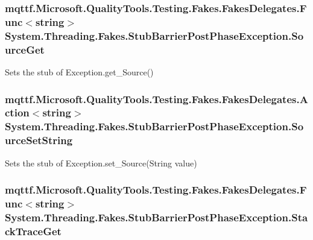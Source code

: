 \hypertarget{class_system_1_1_threading_1_1_fakes_1_1_stub_barrier_post_phase_exception_ab888341b897e42ecb92e83d6db81311c}{
\subsubsection[{Source\-Get}]{\setlength{\rightskip}{0pt plus 5cm}mqttf.\-Microsoft.\-Quality\-Tools.\-Testing.\-Fakes.\-Fakes\-Delegates.\-Func$<$string$>$ System.\-Threading.\-Fakes.\-Stub\-Barrier\-Post\-Phase\-Exception.\-Source\-Get}}\label{class_system_1_1_threading_1_1_fakes_1_1_stub_barrier_post_phase_exception_ab888341b897e42ecb92e83d6db81311c}


Sets the stub of Exception.\-get\-\_\-\-Source()

\hypertarget{class_system_1_1_threading_1_1_fakes_1_1_stub_barrier_post_phase_exception_a8b358045c129a79c3876d8cf061d99c7}{
\subsubsection[{Source\-Set\-String}]{\setlength{\rightskip}{0pt plus 5cm}mqttf.\-Microsoft.\-Quality\-Tools.\-Testing.\-Fakes.\-Fakes\-Delegates.\-Action$<$string$>$ System.\-Threading.\-Fakes.\-Stub\-Barrier\-Post\-Phase\-Exception.\-Source\-Set\-String}}\label{class_system_1_1_threading_1_1_fakes_1_1_stub_barrier_post_phase_exception_a8b358045c129a79c3876d8cf061d99c7}


Sets the stub of Exception.\-set\-\_\-\-Source(\-String value)

\hypertarget{class_system_1_1_threading_1_1_fakes_1_1_stub_barrier_post_phase_exception_a6252fd2bab42cddbb758aab7ccd63432}{
\subsubsection[{Stack\-Trace\-Get}]{\setlength{\rightskip}{0pt plus 5cm}mqttf.\-Microsoft.\-Quality\-Tools.\-Testing.\-Fakes.\-Fakes\-Delegates.\-Func$<$string$>$ System.\-Threading.\-Fakes.\-Stub\-Barrier\-Post\-Phase\-Exception.\-Stack\-Trace\-Get}}\label{class_system_1_1_threading_1_1_fakes_1_1_stub_barrier_post_phase_exception_a6252fd2bab42cddbb758aab7ccd63432}



